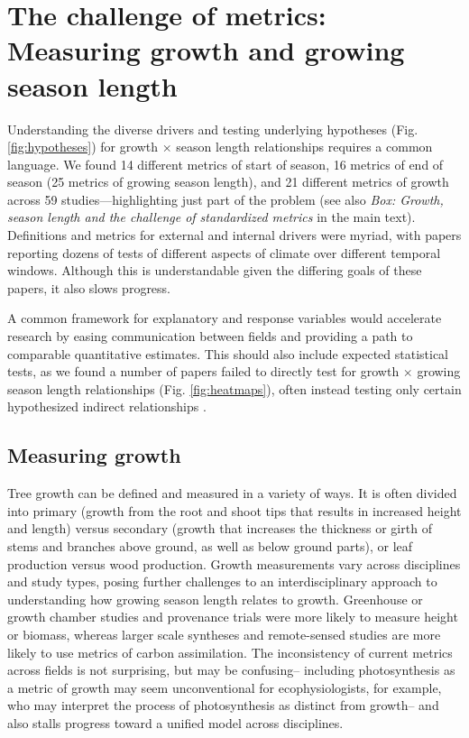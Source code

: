 \documentclass[11pt]{article}
\begin{document}
\section*{The challenge of metrics: Measuring growth and growing season length}

Understanding the diverse drivers and testing underlying hypotheses (Fig. \ref{fig:hypotheses}) for growth $\times$ season length relationships requires a common language. We found 14 different metrics of start of season, 16 metrics of end of season (25 metrics of growing season length), and 21 different metrics of growth across 59 studies---highlighting just part of the problem (see also \emph{Box: Growth, season length and the challenge of standardized metrics} in the main text). Definitions and metrics for external and internal drivers were myriad, %
with papers reporting dozens of tests of different aspects of climate over different temporal windows. Although this is understandable given the differing goals of these papers, it also slows progress. 

A common framework for explanatory and response variables would accelerate research by easing communication between fields and providing a path to comparable quantitative estimates. 
This should also include expected statistical tests, as we found a number of papers failed to directly test for growth $\times$ growing season length relationships (Fig. \ref{fig:heatmaps}), often instead testing only certain hypothesized indirect relationships \citep[e.g. spring temperature $\times$ growth in][]{dow2022warm}. %

\subsection*{Measuring growth}

Tree growth can be defined and measured in a variety of ways. It is often divided into primary (growth from the root and shoot tips that results in increased height and length) versus secondary (growth that increases the thickness or girth of stems and branches above ground, as well as below ground parts), or leaf production versus wood production.  
Growth measurements vary across disciplines and study types, posing further challenges to an interdisciplinary approach to understanding how growing season length relates to growth. 
Greenhouse or growth chamber studies and provenance trials were more likely to measure height or biomass, whereas larger scale syntheses and remote-sensed studies are more likely to use metrics of carbon assimilation. 
The inconsistency of current metrics across fields is not surprising, but may be confusing-- including photosynthesis as a metric of growth may seem unconventional for ecophysiologists, for example, who may interpret the process of photosynthesis as distinct from growth-- and also stalls progress toward a unified model across disciplines.
\end{document}
